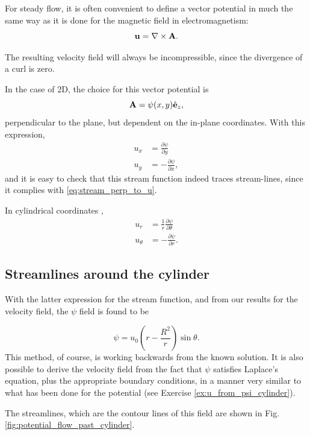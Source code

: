For steady flow, it is often convenient to define a vector potential
 in much the same way as it is done for the
magnetic field in electromagnetism:
\begin{equation}
  \label{eq:vector_potential}
  \mathbf{u} = \nabla\times \mathbf{A} .
\end{equation}

The resulting velocity field will always be incompressible, since the
divergence of a curl is zero.

In the case of 2D, the choice for this vector potential is
\begin{equation}
  \label{eq:A_psi_2D}
  \mathbf{A} = \psi(x,y) \hat{\mathbf{e}}_z ,    
\end{equation}
perpendicular to the plane, but dependent on the in-plane
coordinates. With this expression,
\begin{align*}
  u_x &=  \frac{\partial \psi}{\partial y} \\
  u_y &= -\frac{\partial \psi}{\partial x} ,
\end{align*}
and it is easy to check that this stream function indeed traces
stream-lines, since it complies with \ref{eq:stream_perp_to_u}.

In cylindrical coordinates \cite{wiki:del},
\begin{align*}
u_r &= \frac1r \frac{\partial \psi}{\partial \theta} \\
u_\theta &=   - \frac{\partial \psi}{\partial r} .
\end{align*}


\subsection{Streamlines around the cylinder}

With the latter expression for the stream function, and from our
results for the velocity field, the $\psi$ field is found to be

\begin{equation}\label{eq:streamlines_past_cylinder}
\psi = u_0 \left( r-{\frac {R^{2}}{r}}\right)\sin \theta .
\end{equation}
This method, of course, is working backwards from the known
solution. It is also possible to derive the velocity field from the
fact that $\psi$ satisfies Laplace's equation, plus the appropriate
boundary conditions, in a manner very similar to what has been done
for the potential (see Exercise \ref{ex:u_from_psi_cylinder}).

The streamlines, which are the contour lines of this field are shown in
Fig. \ref{fig:potential_flow_past_cylinder}.




